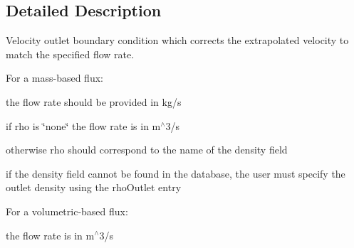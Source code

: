 \subsection{Detailed Description}
Velocity outlet boundary condition which corrects the extrapolated velocity to match the specified flow rate. 

\label{_Description}%
 For a mass-\/based flux\+:
\begin{DoxyItemize}
\item the flow rate should be provided in kg/s
\item if {\ttfamily rho} is \char`\"{}none\char`\"{} the flow rate is in m$^\wedge$3/s
\item otherwise {\ttfamily rho} should correspond to the name of the density field
\item if the density field cannot be found in the database, the user must specify the outlet density using the {\ttfamily rho\+Outlet} entry
\end{DoxyItemize}

For a volumetric-\/based flux\+:
\begin{DoxyItemize}
\item the flow rate is in m$^\wedge$3/s
\end{DoxyItemize}

